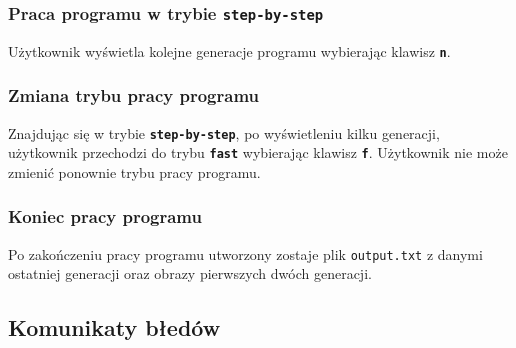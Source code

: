 \documentclass[a4paper]{article}
\begin{document}
	\subsubsection{Praca programu w trybie \texttt{\textbf{step-by-step}}}
	U\.zytkownik wy\'swietla kolejne generacje programu wybieraj\k{a}c klawisz \texttt{\textbf{n}}.
	\subsubsection{Zmiana trybu pracy programu}
	Znajduj\k{a}c si\k{e} w trybie \texttt{\textbf{step-by-step}}, po wy\'swietleniu kilku generacji, u\.zytkownik przechodzi do trybu \texttt{\textbf{fast}} wybieraj\k{a}c klawisz \texttt{\textbf{f}}. U\.zytkownik nie mo\.ze zmieni\'c ponownie trybu pracy programu. 
	\subsubsection{Koniec pracy programu}
        Po zako\'nczeniu pracy programu utworzony zostaje plik \texttt{output.txt} z danymi ostatniej generacji oraz obrazy pierwszych dw\'och generacji.

\subsection{Komunikaty b\l{}ed\'ow}
\end{document}
